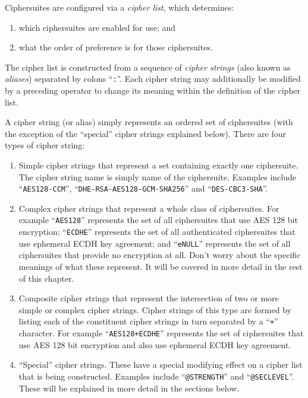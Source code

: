Ciphersuites are configured via a \emph{cipher list}, which determines:
\begin{enumerate}
\item which ciphersuites are enabled for use; and
\item what the order of preference is for those ciphersuites.
\end{enumerate}

The cipher list is constructed from a sequence of \emph{cipher strings} (also 
known as \emph{aliases}) separated by colons ``\verb!:!''. Each cipher string
may additionally be modified by a preceding operator to change its meaning
within the definition of the cipher list.

A cipher string (or alias) simply represents an ordered set of ciphersuites 
(with the exception of the ``special'' cipher strings explained below).
There are four types of cipher string:
\begin{enumerate}
\item Simple cipher strings that represent a set containing exactly one
ciphersuite. The cipher string name is simply name of the ciphersuite. Examples 
include ``\verb!AES128-CCM!'', ``\verb!DHE-RSA-AES128-GCM-SHA256!'' and 
``\verb!DES-CBC3-SHA!''.
\item Complex cipher strings that represent a whole class of ciphersuites. For 
example ``\verb!AES128!'' represents the set of all ciphersuites that use AES
128 bit encryption; ``\verb!ECDHE!'' represents the set of all authenticated
ciphersuites that use ephemeral ECDH key agreement; and ``\verb!eNULL!''
represents the set of all ciphersuites that provide no encryption at all. Don't
worry about the specific meanings of what these represent. It will be covered in
more detail in the rest of this chapter.
\item Composite cipher strings that represent the intersection of two or more 
simple or complex cipher strings. Cipher strings of this type are formed by 
listing each of the constituent cipher strings in turn separated by a 
``\verb!+!'' character. For example ``\verb!AES128+ECDHE!'' represents the set
of ciphersuites that use AES 128 bit encryption and also use ephemeral ECDH key
agreement.
\item ``Special'' cipher strings. These have a special modifying effect on a 
cipher list that is being constructed. Examples include ``\verb!@STRENGTH!'' and 
``\verb!@SECLEVEL!''. These will be explained in more detail in the sections
below.
\end{enumerate}

